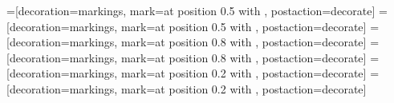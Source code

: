 \newcommand{\restrict}[2]{#1{}_{\mid #2}{}}
\newcommand{\set}[1]{\left\{#1\right\}}
\newcommand{\setc}[2]{\setcl{#1}{#2}}
\newcommand{\setcl}[2]{\left\{ \left. #1 \;\right| \; #2 \right\}}
\newcommand{\setcr}[2]{\left\{ #1 \;\left| \; #2 \right\}\right.}

\newcommand{\floor}[1]{\left\lfloor#1\right\rfloor}
\newcommand{\norm}[1]{\left|\left|#1\right|\right|}
\newcommand{\abs}[1]{\left|#1\right|}

\newcommand{\qi}[2][q]{\left[#2\right]_{#1}}
\newcommand{\qBinomial}[3][q]{\genfrac{[}{]}{0pt}{}{#2}{#3}_{#1}}
\newcommand{\qPoch}[3]{\left(#1;#2\right)_{#3}}

\newcommand{\card}[1]{\sharp{#1}}

\newcommand{\bdy}{\partial}
\newcommand{\compose}{\circ}
\newcommand{\eset}{\emptyset}

\newcommand{\directSum}{\oplus}
\newcommand{\DirectSum}{\bigoplus}
\newcommand{\tensor}{\otimes}
\newcommand{\Tensor}{\bigotimes}

\newcommand{\Homa}[3]{\Hom_{#1}\left(#2,#3\right)}
\newcommand{\Hom}{\operatorname{Hom}}
\newcommand{\End}[1]{\operatorname{End}\left(#1\right)}


\ifpdf
	\usepackage[pdftex,plainpages=false,hypertexnames=false,pdfpagelabels]{hyperref}
	\usepackage[pdftex]{graphicx}
\else
	\usepackage[plainpages=false,hypertexnames=false,pdfpagelabels]{hyperref}
	\usepackage{graphicx}
\fi

\usepackage{tikz}
\usetikzlibrary{shapes}
\usetikzlibrary{backgrounds}
\usetikzlibrary{decorations,decorations.pathreplacing,decorations.markings}
\usetikzlibrary{fit,calc,through}
\usetikzlibrary{external}

=[decoration={markings, mark=at position 0.5 with {\arrow{>}}}, postaction={decorate}]
=[decoration={markings, mark=at position 0.5 with {\arrow{<}}}, postaction={decorate}]
=[decoration={markings, mark=at position 0.8 with {\arrow{>}}}, postaction={decorate}]
=[decoration={markings, mark=at position 0.8 with {\arrow{<}}}, postaction={decorate}]
=[decoration={markings, mark=at position 0.2 with {\arrow{>}}}, postaction={decorate}]
=[decoration={markings, mark=at position 0.2 with {\arrow{<}}}, postaction={decorate}]

\def\Foam{{\mathcal{F}{\rm oam}}}
\newcommand{\alt}{\wedge}
\newcommand{\Alt}[2]{{\textstyle\bigwedge^{#1}_{#2}}}
\newcommand{\Usl}[1]{U\sl_{#1}}
\newcommand{\one}{1}
\def\sA{\mathcal{A}}
\def\l{\lambda}
\def\bZ{{\mathbb{Z}}}
\def\sl{{\mathfrak{sl}}}
\def\Sp{{\mathcal{S}p}}
\def\FSp{{\mathcal{FS}p}}
\def\bC{{\mathbb{C}}}
\def\g{{\mathfrak{g}}}
\def\SL{{\rm{SL}}}
\def\GL{{\rm{GL}}}
\def\gl{{\mathfrak{gl}}}
\def\dU{\dot{{\mathcal{U}}}_q}
\def\Uq{\mathcal{U}_q}
\def\Rep{\mathcal{R}ep}
\def\la{\langle}
\def\ra{\rangle}
\def\dalg{\dot{{U}}_q}

